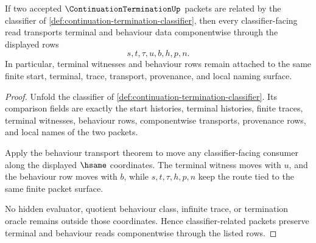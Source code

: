 \begin{theorem}
\label{thm:continuation-termination-classifier-stability}
If two accepted $\ContinuationTerminationUp$ packets are related by the classifier of \autoref{def:continuation-termination-classifier}, then every classifier-facing read transports terminal and behaviour data componentwise through the displayed rows
$$
s,t,\tau,u,b,h,p,n.
$$
In particular, terminal witnesses and behaviour rows remain attached to the same finite start, terminal, trace, transport, provenance, and local naming surface.
\end{theorem}
\begin{proof}
Unfold the classifier of \autoref{def:continuation-termination-classifier}. Its comparison fields are exactly the start histories, terminal histories, finite traces, terminal witnesses, behaviour rows, componentwise transports, provenance rows, and local names of the two packets.

Apply the behaviour transport theorem to move any classifier-facing consumer along the displayed $\hsame$ coordinates. The terminal witness moves with $u$, and the behaviour row moves with $b$, while $s,t,\tau,h,p,n$ keep the route tied to the same finite packet surface.

No hidden evaluator, quotient behaviour class, infinite trace, or termination oracle remains outside those coordinates. Hence classifier-related packets preserve terminal and behaviour reads componentwise through the listed rows.
\end{proof}

\begin{closurestatus}{\ContinuationTerminationUp}
  \theoryclosure{\seedClosure}
  \formalstatus{\unformalizedV}
\end{closurestatus}
